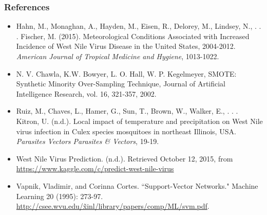 \documentclass{article} %
\begin{document}
\subsubsection*{References}
\begin{itemize}

\item[] Hahn, M., Monaghan, A., Hayden, M., Eisen, R., Delorey, M., Lindsey, N., . . . Fischer, M. (2015). Meteorological Conditions Associated with Increased Incidence of West Nile Virus Disease in the United States, 2004-2012. \textit{American Journal of Tropical Medicine and Hygiene}, 1013-1022.

\item[] N. V. Chawla, K.W. Bowyer, L. O. Hall, W. P. Kegelmeyer, SMOTE: Synthetic Minority Over-Sampling Technique, Journal of Artificial Intelligence Research, vol. 16, 321-357, 2002.

\item[] Ruiz, M., Chaves, L., Hamer, G., Sun, T., Brown, W., Walker, E., . . . Kitron, U. (n.d.). Local impact of temperature and precipitation on West Nile virus infection in Culex species mosquitoes in northeast Illinois, USA. \textit{Parasites Vectors Parasites \& Vectors}, 19-19.

\item[] West Nile Virus Prediction. (n.d.). Retrieved October 12, 2015, from \href{https://www.kaggle.com/c/predict-west-nile-virus}{https://www.kaggle.com/c/predict-west-nile-virus}

\item[] Vapnik, Vladimir, and Corinna Cortes. ``Support-Vector Networks." Machine Learning 20 (1995): 273-97.  \href{http://csee.wvu.edu/~xinl/library/papers/comp/ML/svm.pdf}{http://csee.wvu.edu/\~xinl/library/papers/comp/ML/svm.pdf}.

\end{itemize}
\end{document}
